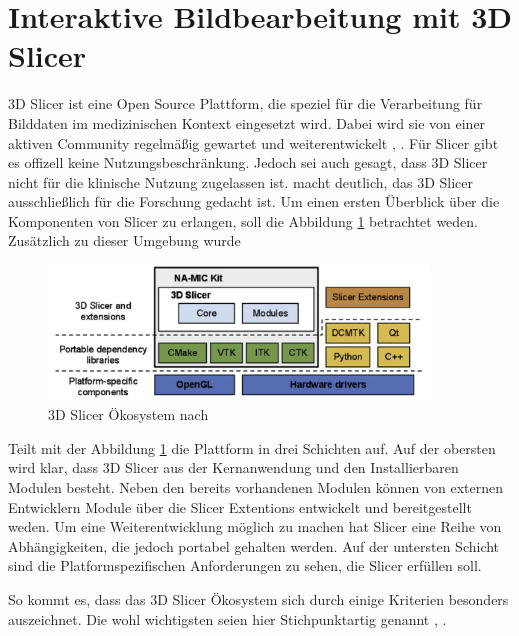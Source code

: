 \section{Interaktive Bildbearbeitung mit 3D Slicer}
\label{sec:3d_slicer} 3D Slicer ist eine Open Source Plattform, die speziel für die
Verarbeitung für Bilddaten im medizinischen Kontext eingesetzt wird. Dabei wird
sie von einer aktiven Community regelmäßig gewartet und weiterentwickelt \citep[vgl.][]{slicer2024},
\citep[vgl.][]{fedorov2012slicer}. Für Slicer gibt es offizell keine
Nutzungsbeschränkung. Jedoch sei auch gesagt, dass 3D Slicer nicht für die
klinische Nutzung zugelassen ist. \citet{fedorov2012slicer} macht deutlich, das 3D
Slicer ausschließlich für die Forschung gedacht ist. Um einen ersten Überblick
über die Komponenten von Slicer zu erlangen, soll die Abbildung \ref{fig:3d_slicer_oekosystem}
betrachtet weden. Zusätzlich zu dieser Umgebung wurde

\begin{figure}[h]
	\centering
	\includegraphics[width=0.9\textwidth]{img/3d_slicer_overview.jpg}
	\caption{3D Slicer Ökosystem nach \citet[Seite 1326]{fedorov2012slicer}}
	\label{fig:3d_slicer_oekosystem}
\end{figure}

\citet[Seite 1326]{fedorov2012slicer} Teilt mit der Abbildung
\ref{fig:3d_slicer_oekosystem} die Plattform in drei Schichten auf. Auf der obersten
wird klar, dass 3D Slicer aus der Kernanwendung und den Installierbaren Modulen
besteht. Neben den bereits vorhandenen Modulen können von externen Entwicklern Module
über die Slicer Extentions entwickelt und bereitgestellt weden. Um eine
Weiterentwicklung möglich zu machen hat Slicer eine Reihe von Abhängigkeiten, die
jedoch portabel gehalten werden. Auf der untersten Schicht sind die
Platformspezifischen Anforderungen zu sehen, die Slicer erfüllen soll.

So kommt es, dass das 3D Slicer Ökosystem sich durch einige Kriterien besonders
auszeichnet. Die wohl wichtigsten seien hier Stichpunktartig genannt \citep[vgl.][]{slicer2024},
\citep[vgl.][]{fedorov2012slicer}.

